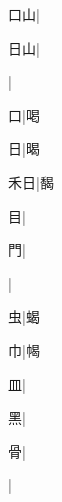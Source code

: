 \begin{multicols}{2}
{{\cjk{}{\cnsym{}　}口山}|{}\par
{\cjk{}{\cnsym{}　}日山}|{}\par
{}|{}\par
{\cjk{}{\cnsym{}　}{\cnsym{}　}口}|{\cjk{}喝}\par
{\cjk{}{\cnsym{}　}{\cnsym{}　}日}|{\cjk{}暍}\par
{\cjk{}{\cnsym{}　}禾日}|{\cjk{}馤}\par
{\cjk{}{\cnsym{}　}{\cnsym{}　}目}|{}\par
{\cjk{}{\cnsym{}　}{\cnsym{}　}門}|{}\par
{}|{}\par
{\cjk{}{\cnsym{}　}{\cnsym{}　}虫}|{\cjk{}蝎}\par
{\cjk{}{\cnsym{}　}{\cnsym{}　}巾}|{\cjk{}幆}\par
{皿}|{}\par
{\cjk{}{\cnsym{}　}{\cnsym{}　}黑}|{}\par
{\cjk{}{\cnsym{}　}{\cnsym{}　}骨}|{}\par
{}|{}\par
}
\end{multicols}
